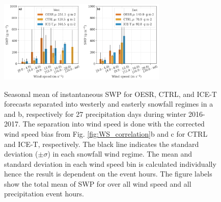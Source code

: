 \documentclass{ametsocV5}
\begin{document}
\begin{figure}
    \noindent\includegraphics[width=19pc,angle=0]{fig10.png}\\
    \caption{Seasonal mean of instantaneous SWP for OESR, CTRL, and ICE-T forecasts separated into westerly and easterly snowfall regimes in a and b, respectively for 27 precipitation days during winter 2016-2017. The separation into wind speed is done with the corrected wind speed bias from Fig. \ref{fig:WS_correlation}b and c for CTRL and ICE-T, respectively. The black line indicates the standard deviation ($\pm \sigma$) in each snowfall wind regime. The mean and standard deviation in each wind speed bin is calculated individually hence the result is dependent on the event hours. The figure labels show the total mean of SWP for over all wind speed and all precipitation event hours. %
}
    \label{fig:swp_WS_WD}
\end{figure}
%
\end{document}

